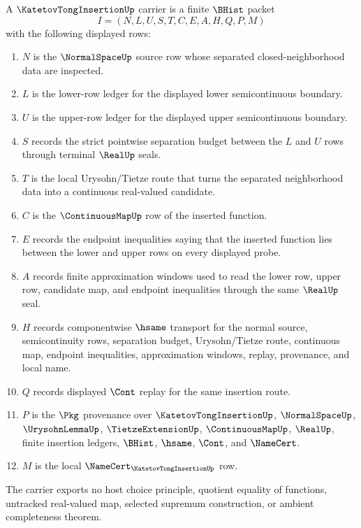 \begin{definition}
\label{def:katetov-tong-insertion-carrier}
A $\KatetovTongInsertionUp$ carrier is a finite $\BHist$ packet
$$
I=(N,L,U,S,T,C,E,A,H,Q,P,M)
$$
with the following displayed rows:
\begin{enumerate}
\item $N$ is the $\NormalSpaceUp$ source row whose separated closed-neighborhood data are inspected.
\item $L$ is the lower-row ledger for the displayed lower semicontinuous boundary.
\item $U$ is the upper-row ledger for the displayed upper semicontinuous boundary.
\item $S$ records the strict pointwise separation budget between the $L$ and $U$ rows through terminal $\RealUp$ seals.
\item $T$ is the local Urysohn/Tietze route that turns the separated neighborhood data into a continuous real-valued candidate.
\item $C$ is the $\ContinuousMapUp$ row of the inserted function.
\item $E$ records the endpoint inequalities saying that the inserted function lies between the lower and upper rows on every displayed probe.
\item $A$ records finite approximation windows used to read the lower row, upper row, candidate map, and endpoint inequalities through the same $\RealUp$ seal.
\item $H$ records componentwise $\hsame$ transport for the normal source, semicontinuity rows, separation budget, Urysohn/Tietze route, continuous map, endpoint inequalities, approximation windows, replay, provenance, and local name.
\item $Q$ records displayed $\Cont$ replay for the same insertion route.
\item $P$ is the $\Pkg$ provenance over $\KatetovTongInsertionUp$, $\NormalSpaceUp$, $\UrysohnLemmaUp$, $\TietzeExtensionUp$, $\ContinuousMapUp$, $\RealUp$, finite insertion ledgers, $\BHist$, $\hsame$, $\Cont$, and $\NameCert$.
\item $M$ is the local $\NameCert_{\KatetovTongInsertionUp}$ row.
\end{enumerate}
The carrier exports no host choice principle, quotient equality of functions, untracked real-valued map, selected supremum construction, or ambient completeness theorem.
\end{definition}

